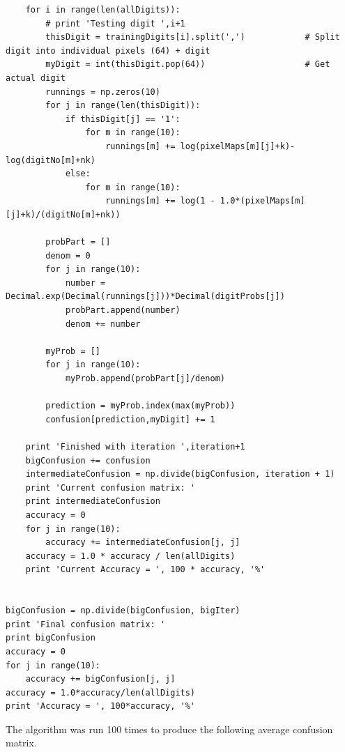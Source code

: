 \documentclass[10pt]{article}
\begin{document}
\begin{lstlisting}
    for i in range(len(allDigits)):
        # print 'Testing digit ',i+1
        thisDigit = trainingDigits[i].split(',')            # Split digit into individual pixels (64) + digit
        myDigit = int(thisDigit.pop(64))                    # Get actual digit
        runnings = np.zeros(10)
        for j in range(len(thisDigit)):
            if thisDigit[j] == '1':
                for m in range(10):
                    runnings[m] += log(pixelMaps[m][j]+k)-log(digitNo[m]+nk)
            else:
                for m in range(10):
                    runnings[m] += log(1 - 1.0*(pixelMaps[m][j]+k)/(digitNo[m]+nk))

        probPart = []
        denom = 0
        for j in range(10):
            number = Decimal.exp(Decimal(runnings[j]))*Decimal(digitProbs[j])
            probPart.append(number)
            denom += number

        myProb = []
        for j in range(10):
            myProb.append(probPart[j]/denom)

        prediction = myProb.index(max(myProb))
        confusion[prediction,myDigit] += 1

    print 'Finished with iteration ',iteration+1
    bigConfusion += confusion
    intermediateConfusion = np.divide(bigConfusion, iteration + 1)
    print 'Current confusion matrix: '
    print intermediateConfusion
    accuracy = 0
    for j in range(10):
        accuracy += intermediateConfusion[j, j]
    accuracy = 1.0 * accuracy / len(allDigits)
    print 'Current Accuracy = ', 100 * accuracy, '%'


bigConfusion = np.divide(bigConfusion, bigIter)
print 'Final confusion matrix: '
print bigConfusion
accuracy = 0
for j in range(10):
    accuracy += bigConfusion[j, j]
accuracy = 1.0*accuracy/len(allDigits)
print 'Accuracy = ', 100*accuracy, '%'
\end{lstlisting}
The algorithm was run 100 times to produce the following average confusion matrix.   
\end{document}
